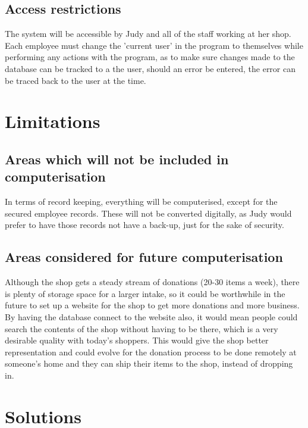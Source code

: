 \subsection{Access restrictions}
The system will be accessible by Judy and all of the staff working at her shop. Each employee must change the 'current user' in the program to themselves while performing any actions with the program, as to make sure changes made to the database can be tracked to a the user, should an error be entered, the error can be traced back to the user at the time.

\section{Limitations}

\subsection{Areas which will not be included in computerisation}
In terms of record keeping, everything will be computerised, except for the secured employee records. These will not be converted digitally, as Judy would prefer to have those records not have a back-up, just for the sake of security.


\subsection{Areas considered for future computerisation}
Although the shop gets a steady stream of donations (20-30 items a week), there is plenty of storage space for a larger intake, so it could be worthwhile in the future to set up a website for the shop to get more donations and more business. By having the database connect to the website also, it would mean people could search the contents of the shop without having to be there, which is a very desirable quality with today’s shoppers. This would give the shop better representation and could evolve for the donation process to be done remotely at someone’s home and they can ship their items to the shop, instead of dropping in.

\section{Solutions}

